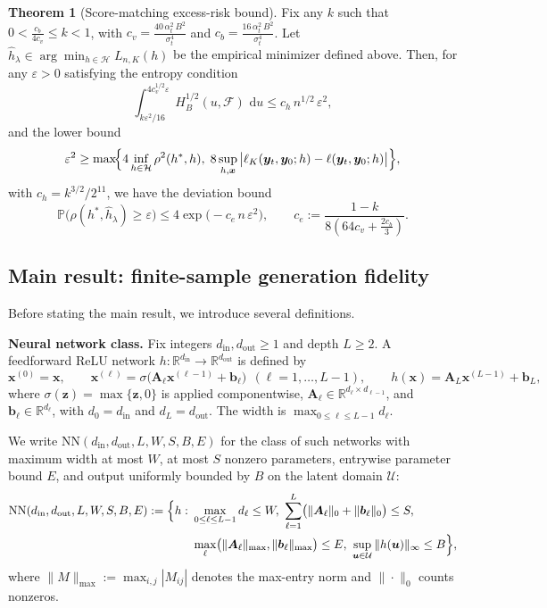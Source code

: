 \documentclass[12pt]{article}
\theoremstyle{definition} %
\newtheorem{theorem}{Theorem}
\newcommand{\R}{\mathbb{R}}
\renewcommand{\P}{\ensuremath{\mathbb{P}}} %
\newcommand{\dd}{\,\mathrm{d}}
\newcommand{\y}{\bm y}
\newcommand{\x}{\bm x}
\begin{document}
\begin{theorem}[Score-matching excess-risk bound]
\label{thm:score-matching}
Fix any $k$ such that
$0<\frac{c_b}{4c_v}\le k<1$, with $c_v=\frac{40\,\alpha_t^2\,B^2}{\sigma_t^4}$ and $c_b=\frac{16\,\alpha_t^2\,B^2}{\sigma_t^4}$.
Let $\hat h_{\lambda}\in\arg\min_{h\in\mathcal{H}}L_{n,K}(h)$ be the empirical minimizer defined above.
Then, for any $\varepsilon>0$ satisfying the entropy condition
\begin{equation}
\label{entropy}
\int_{k\varepsilon^2/16}^{4 c^{1/2}_{v} \varepsilon}
H_B^{1/2}(u,\mathcal{F})\, \dd u
\leq c_{h} \, n^{1/2} \, \varepsilon^2,
\end{equation}
and the lower bound
\begin{equation}
\label{2approx}
\varepsilon^2 \geq \max\!\Bigl\{4\inf_{h\in \mathcal{H}}\rho^2(h^*,h),\;8\sup_{h,\x}\big|\ell_K(\y_t,\y_0;h)-\ell(\y_t,\y_0;h)\big|\Bigr\},
\end{equation}
with $c_{h}=k^{3/2}/2^{11}$, we have the deviation bound
\[
\P\!\bigl(\rho(h^*,\hat h_{\lambda}) \geq \varepsilon\bigr)
\leq 4 \exp\!\bigl(- c_e\, n\, \varepsilon^2\bigr),
\qquad
c_e :=\frac{1-k}{8(64c_v+\frac{2c_b}{3})}.
\]
\end{theorem}



\subsection{Main result: finite-sample generation fidelity}

Before stating the main result, we introduce several definitions.

\noindent\textbf{Neural network class.}
Fix integers $d_{\mathrm{in}},d_{\mathrm{out}}\ge 1$ and depth $L\ge 2$.
A feedforward ReLU network $h:\R^{d_{\mathrm{in}}}\to\R^{d_{\mathrm{out}}}$ is defined by
\[
\x^{(0)}=\x,\qquad
\x^{(\ell)}=\sigma\!\big(\bm{A}_\ell \bm{x}^{(\ell-1)}+\bm{b}_\ell\big)\ \ (\ell=1,\dots,L-1),\qquad
h(\x)=\bm{A}_L \x^{(L-1)}+\bm{b}_L,
\]
where $\sigma(\bm z)=\max\{\bm{z},0\}$ is applied componentwise, $\bm A_\ell\in\R^{d_{\ell}\times d_{\ell-1}}$, and $\bm b_\ell\in\R^{d_\ell}$, with
$d_0=d_{\mathrm{in}}$ and $d_L=d_{\mathrm{out}}$.
The width is $\max_{0\le \ell\le L-1} d_\ell$.

We write $\mathrm{NN}(d_{\mathrm{in}},d_{\mathrm{out}},L,W,S,B,E)$ for the class of such networks with
maximum width at most $W$, at most $S$ nonzero parameters, entrywise parameter bound $E$, and output uniformly bounded by $B$ on the latent domain $\mathcal U$:
\begin{align}
\label{eq:NN-class}
\mathrm{NN}(d_{\mathrm{in}},d_{\mathrm{out}},L,W,S,B,E)
:=\Bigl\{h:\ 
&\max_{0\le \ell\le L-1} d_\ell \le W,\ 
\sum_{\ell=1}^{L}\bigl(\|\bm A_\ell\|_0+\|\bm b_\ell\|_0\bigr)\le S,\nonumber\\
&\max_{\ell}\bigl(\|\bm A_\ell\|_{\max},\|\bm b_\ell\|_{\max}\bigr)\le E,\ 
\sup_{\bm u\in\mathcal U}\|h(\bm u)\|_\infty \le B
\Bigr\},
\end{align}
where $\|M\|_{\max}:=\max_{i,j}|M_{ij}|$ denotes the max-entry norm and $\|\cdot\|_0$ counts nonzeros.
\end{document}
